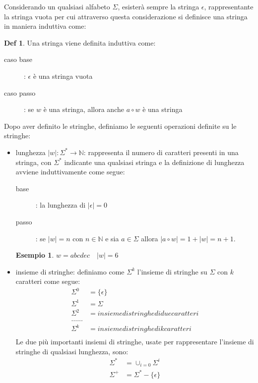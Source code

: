 \documentclass[a4paper]{report}
\theoremstyle{definition}%
\newtheorem*{defi}{Def}%
\newtheorem*{esempio}{Esempio}
\newcommand{\numberset}{\mathbb}
\newcommand{\N}{\numberset{N}}
\begin{document}
Considerando un qualsiasi alfabeto $\Sigma$, esisterà sempre la stringa $\epsilon$, rappresentante la stringa vuota per cui
attraverso questa considerazione si definisce una stringa in maniera induttiva come:
\begin{defi}
 Una stringa viene definita induttiva come:
    \begin{description}
      \item [caso base]: $\epsilon$ è una stringa vuota
      \item [caso passo]: se $w$ è una stringa, allora anche $a \circ w $ è una stringa
    \end{description}
\end{defi}
Dopo aver definito le stringhe, definiamo le seguenti operazioni definite su le stringhe:
  \begin{itemize}
  \item lunghezza $|w|: \Sigma ^ * \to \N$: rappresenta il numero di caratteri presenti in una stringa, con $\Sigma ^ *$ indicante
        una qualsiasi stringa e la definizione di lunghezza avviene induttivamente come segue:
        \begin{description}
        \item [base]: la lunghezza di $|\epsilon| = 0$
        \item [passo]: se $|w| = n$ con $n \in \N$ e sia $a \in \Sigma$ allora $|a \circ w| = 1 + |w| = n + 1$.
        \end{description}
        \begin{esempio}
          $w = abcdec  \quad |w| = 6$
        \end{esempio}
  \item insieme di stringhe: definiamo come $\Sigma ^ k$ l'insieme di stringhe su $\Sigma$ con $k$ caratteri come segue:
        \begin{align}
          \Sigma ^ 0 & = \{ \epsilon\} \\
          \Sigma ^ 1 & = \Sigma \\
          \Sigma ^ 2 & = insieme di stringhe di due caratteri \\
          \dots \dots \\
          \Sigma ^ k & = insieme di stringhe di k caratteri \\
        \end{align}
        Le due più importanti insiemi di stringhe, usate per rappresentare l'insieme di stringhe di qualsiasi lunghezza, sono:
        \begin{align}
          \Sigma ^ * & = \cup _{i = 0} \Sigma ^ i \\
          \Sigma ^ + & = \Sigma ^ * - \{\epsilon\} \\
        \end{align}
        

\end{itemize}
\end{document}
